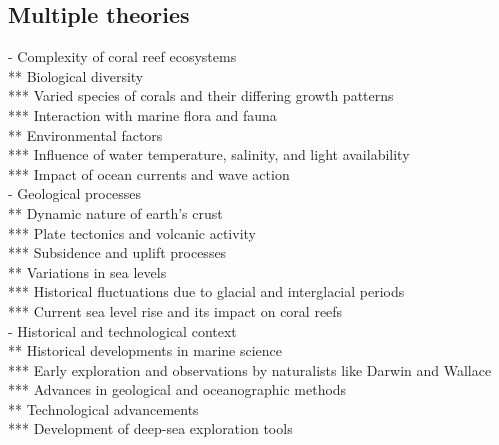 
\subsection{Multiple theories}
- Complexity of coral reef ecosystems \\
** Biological diversity \\
*** Varied species of corals and their differing growth patterns \\
*** Interaction with marine flora and fauna \\
** Environmental factors \\
*** Influence of water temperature, salinity, and light availability \\
*** Impact of ocean currents and wave action \\
- Geological processes \\
** Dynamic nature of earth's crust \\
*** Plate tectonics and volcanic activity \\
*** Subsidence and uplift processes \\
** Variations in sea levels \\
*** Historical fluctuations due to glacial and interglacial periods \\
*** Current sea level rise and its impact on coral reefs \\
- Historical and technological context \\
** Historical developments in marine science \\
*** Early exploration and observations by naturalists like Darwin and Wallace \\
*** Advances in geological and oceanographic methods \\
** Technological advancements \\
*** Development of deep-sea exploration tools \\
